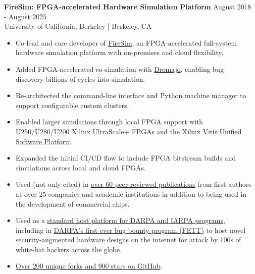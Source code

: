 \documentclass[line]{res}
\begin{document}
\begin{resume}
\label{sec:firesim}
\textbf{FireSim: FPGA-accelerated Hardware Simulation Platform} \hfill August 2018 - August 2025
\\
University of California, Berkeley | Berkeley, CA
\\
\vspace{-3mm}
\begin{itemize}
\item Co-lead and core developer of \href{https://fires.im/}{FireSim}, an FPGA-accelerated full-system hardware simulation platform with on-premises and cloud flexibility.
\item Added FPGA-accelerated co-simulation with \href{https://github.com/chipsalliance/dromajo}{Dromajo}, enabling bug discovery billions of cycles into simulation.
\item Re-architected the command-line interface and Python machine manager to support configurable custom clusters.
\item Enabled larger simulations through local FPGA support with \href{https://www.amd.com/en/products/accelerators/alveo/u250/a-u250-a64g-pq-g.html}{U250}/\href{https://docs.amd.com/r/en-US/ds963-u280}{U280}/\href{https://www.amd.com/en/products/accelerators/alveo/u200/a-u200-a64g-pq-g.html}{U200} Xilinx UltraScale+ FPGAs and the \href{https://www.amd.com/en/products/software/adaptive-socs-and-fpgas/vitis.html}{Xilinx Vitis Unified Software Platform}.
\item Expanded the initial CI/CD flow to include FPGA bitstream builds and simulations across local and cloud FPGAs.
\item Used (not only cited) in \href{https://fires.im/publications/#userpapers}{over 60 peer-reviewed publications} from first authors at over 25 companies and academic institutions in addition to being used in the development of commercial chips.
\item Used as a \href{https://fires.im/workshop-2023/}{standard host platform for DARPA and IARPA programs}, including in \href{https://fett.darpa.mil/}{DARPA's first ever bug bounty program (FETT)} to host novel security-augmented hardware designs on the internet for attack by 100s of white-hat hackers across the globe.
\item \href{https://github.com/firesim/firesim}{Over 200 unique forks and 900 stars on GitHub}.
\end{itemize}

\vspace{-2mm}


\end{resume}
\end{document}
